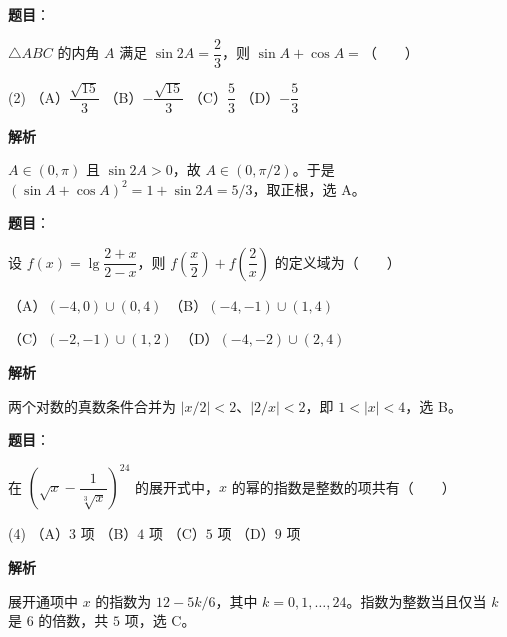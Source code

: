 \begin{answer}

\textbf{题目}：

$\triangle ABC$ 的内角 $A$ 满足 $\sin 2A=\dfrac23$，则 $\sin A+\cos A=$\mbox{（　　）}

\begin{gkopts}(2)
\task （A）$\dfrac{\sqrt{15}}3$
\task （B）$-\dfrac{\sqrt{15}}3$
\task （C）$\dfrac53$
\task （D）$-\dfrac53$
\end{gkopts}

\textbf{解析}

$A\in(0,\pi)$ 且 $\sin2A>0$，故 $A\in(0,\pi/2)$。于是 $(\sin A+\cos A)^2=1+\sin2A=5/3$，取正根，选 A。


\end{answer}
\begin{answer}

\textbf{题目}：

设 $f(x)=\lg\dfrac{2+x}{2-x}$，则 $f\left(\dfrac{x}{2}\right)+f\left(\dfrac{2}{x}\right)$ 的定义域为\mbox{（　　）}

（A）$(-4,0)\cup(0,4)$　（B）$(-4,-1)\cup(1,4)$

（C）$(-2,-1)\cup(1,2)$　（D）$(-4,-2)\cup(2,4)$

\textbf{解析}

两个对数的真数条件合并为 $|x/2|<2$、$|2/x|<2$，即 $1<|x|<4$，选 B。


\end{answer}
\begin{answer}

\textbf{题目}：

在 $\left(\sqrt{x}-\dfrac{1}{\sqrt[3]{x}}\right)^{24}$ 的展开式中，$x$ 的幂的指数是整数的项共有\mbox{（　　）}

\begin{gkopts}(4)
\task （A）$3$ 项
\task （B）$4$ 项
\task （C）$5$ 项
\task （D）$9$ 项
\end{gkopts}

\textbf{解析}

展开通项中 $x$ 的指数为 $12-5k/6$，其中 $k=0,1,\ldots,24$。指数为整数当且仅当 $k$ 是 $6$ 的倍数，共 $5$ 项，选 C。


\end{answer}
